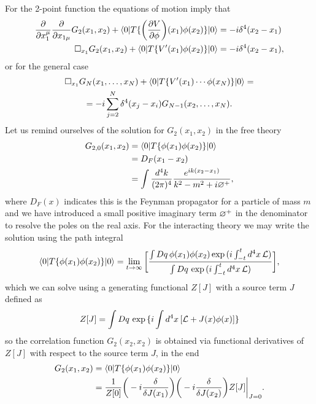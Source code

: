 For the 2-point function the equations of motion imply that 
\begin{align}
    \frac{\partial}{\partial x_1^\mu}\frac{\partial}{\partial x_{1\mu}}G_2(x_1,x_2) + \langle 0 | T\{\bigg(\frac{\partial V}{\partial \phi}\bigg)(x_1)\phi(x_2)\} | 0 \rangle &= -i\delta^4(x_2 - x_1) \\
    \square_{x_1}G_2(x_1,x_2) + \langle 0 | T\{V'(x_1)\phi(x_2)\} | 0 \rangle &= -i\delta^4(x_2 - x_1),
\end{align}
or for the general case
\begin{multline}
    \square_{x_1}G_N(x_1,\dots,x_N) + \langle 0 | T\{V'(x_1)\cdots\phi(x_N)\} | 0 \rangle = \\
    = -i\sum_{j=2}^N\delta^4(x_j - x_i)G_{N-1}(x_2,\dots,x_N).
\end{multline}
Let us remind ourselves of the solution for $G_2(x_1,x_2)$ in the free theory
\begin{equation}
    \begin{split}
        G_{2,0}(x_1,x_2) &= \langle 0 | T\{\phi(x_1)\phi(x_2)\} | 0 \rangle \\
        &= D_F(x_1 - x_2) \\
        &= \int\frac{d^4k}{(2\pi)^4}\frac{e^{ik(x_2 - x_1)}}{k^2 - m^2 + i\varnothing^+},
    \end{split}
\end{equation}
where $D_F(x)$ indicates this is the Feynman propagator for a particle of mass $m$ and we have introduced a small positive imaginary term $\varnothing^+$ in the denominator to resolve the poles on the real axis. For the interacting theory we may write the solution using the path integral 
\begin{equation}
    \langle 0 | T\{\phi(x_1)\phi(x_2)\} | 0 \rangle = \lim_{t\to\infty}\bigg[\frac{\int Dq\,\phi(x_1)\phi(x_2)\exp{(i\int_{-t}^t d^4x\,\mathcal{L})}}{\int Dq\,\exp{(i\int_{-t}^t d^4x\,\mathcal{L})}}\bigg],
\end{equation}
which we can solve using a generating functional $Z[J]$ with a source term $J$ defined as
\begin{equation}
    Z[J] = \int Dq\,\exp{\{i\int d^4x\,[\mathcal{L}+ J(x)\phi(x)]\}}
\end{equation}
so the correlation function $G_2(x_2,x_2)$ is obtained via functional derivatives of $Z[J]$ with respect to the source term $J$, in the end
\begin{equation}
    \begin{split}
            G_2(x_1,x_2) &= \langle 0 | T\{\phi(x_1)\phi(x_2)\} | 0 \rangle \\
            &= \frac{1}{Z[0]}\bigg(-i\frac{\delta}{\delta J(x_1)}\bigg)\bigg(-i\frac{\delta}{\delta J(x_2)}\bigg)Z[J]\bigg|_{J=0}.
    \end{split}
\end{equation}

